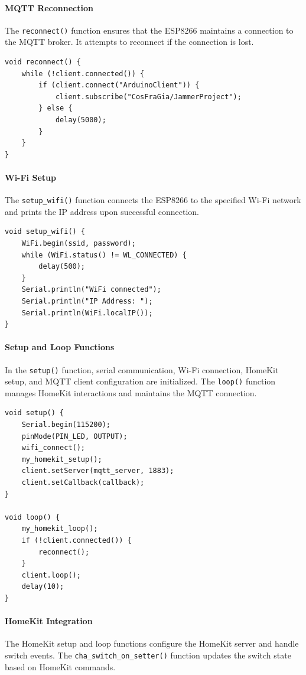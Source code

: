 \paragraph{MQTT Reconnection}
The \texttt{reconnect()} function ensures that the ESP8266 maintains a connection to the MQTT broker. It attempts to reconnect if the connection is lost.

\begin{verbatim}
void reconnect() {
    while (!client.connected()) {
        if (client.connect("ArduinoClient")) {
            client.subscribe("CosFraGia/JammerProject");
        } else {
            delay(5000);
        }
    }
}
\end{verbatim}

\paragraph{Wi-Fi Setup}
The \texttt{setup\_wifi()} function connects the ESP8266 to the specified Wi-Fi network and prints the IP address upon successful connection.

\begin{verbatim}
void setup_wifi() {
    WiFi.begin(ssid, password);
    while (WiFi.status() != WL_CONNECTED) {
        delay(500);
    }
    Serial.println("WiFi connected");
    Serial.println("IP Address: ");
    Serial.println(WiFi.localIP());
}
\end{verbatim}

\paragraph{Setup and Loop Functions}
In the \texttt{setup()} function, serial communication, Wi-Fi connection, HomeKit setup, and MQTT client configuration are initialized. The \texttt{loop()} function manages HomeKit interactions and maintains the MQTT connection.

\begin{verbatim}
void setup() {
    Serial.begin(115200);
    pinMode(PIN_LED, OUTPUT);
    wifi_connect();
    my_homekit_setup();
    client.setServer(mqtt_server, 1883);
    client.setCallback(callback);
}

void loop() {
    my_homekit_loop();
    if (!client.connected()) {
        reconnect();
    }
    client.loop();
    delay(10);
}
\end{verbatim}

\paragraph{HomeKit Integration}
The HomeKit setup and loop functions configure the HomeKit server and handle switch events. The \texttt{cha\_switch\_on\_setter()} function updates the switch state based on HomeKit commands.

